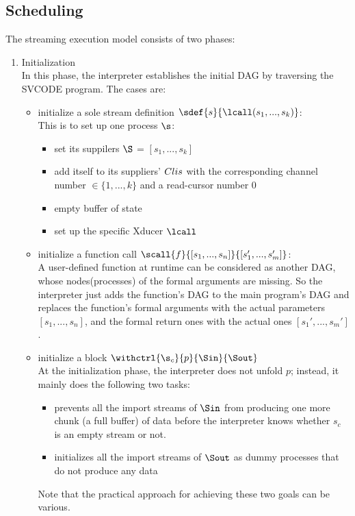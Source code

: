 \subsection{Scheduling}
The streaming execution model consists of two phases:
\begin{enumerate}[(1)]
\item Initialization \\
In this phase, the interpreter establishes the initial DAG by traversing the SVCODE program. The cases are:
\begin{itemize}
	\item initialize a sole stream definition $\sdef{s}{\lcall(s_1,...,s_k)}$: \\
	This is to set up one process $\s$:
	\begin{itemize}
		\item set its suppilers $\S$ = $[s_1,...,s_k]$
		\item add itself to its suppliers' $\clis$ with the corresponding channel number $\in \{1,...,k\}$ and a read-cursor number 0
		\item empty buffer of state \filling
		\item set up the specific Xducer $\lcall$
	\end{itemize}

	
	\item initialize a function call  $\scall{f}{[s_1,...,s_n]}{[s_1',...,s_m']}$: \\
	A user-defined function at runtime can be considered as another DAG, whose nodes(processes) of the formal arguments are missing. 
	So the interpreter just adds the function's DAG to the main program's DAG 
	and replaces the function's formal arguments with the actual parameters $[s_1,...,s_n]$, and the formal return ones with the actual ones $[s_1',...,s_m']$.  

	
	\item initialize a \wc block $\withctrl{\s_c}{p}{\Sin}{\Sout}$ \\
	At the initialization phase, the interpreter does not unfold $p$; instead, it mainly does the following two tasks:	
	\begin{itemize}
		\item prevents all the import streams of $\Sin$ from producing one more chunk (a full buffer) of data before the interpreter knows whether $s_c$ is an empty stream or not.
		\item initializes all the import streams of $\Sout$ as dummy processes that do not produce any data
	\end{itemize}
	Note that the practical approach for achieving these two goals can be various.
	

\end{itemize}
\end{enumerate}
